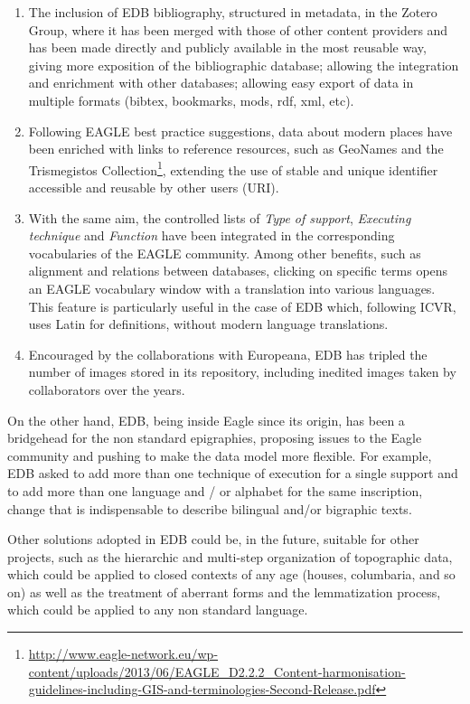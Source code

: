 \documentclass[amsthm,ebook]{saparticle}
\begin{document}
\begin{enumerate}
\item The inclusion of EDB bibliography, structured in metadata, in the Zotero Group, where it has been merged with those
of other content providers and has been made directly and publicly available in the most reusable way, giving more
exposition of the bibliographic database; allowing the integration and enrichment with other databases; allowing easy
export of data in multiple formats (bibtex, bookmarks, mods, rdf, xml, etc).

\item Following EAGLE best practice suggestions, data about modern places have been enriched with links to reference
resources, such as GeoNames and the Trismegistos Collection\footnote{
\url{http://www.eagle-network.eu/wp-content/uploads/2013/06/EAGLE\_D2.2.2\_Content-harmonisation-guidelines-including-GIS-and-terminologies-Second-Release.pdf}},
extending the use of stable and unique identifier accessible and reusable by other users (URI).

\item With the same aim, the controlled lists of \emph{Type of support}, \emph{Executing technique} and \emph{Function} have been integrated in
the corresponding vocabularies of the EAGLE community. Among other benefits, such as alignment and relations between
databases, clicking on specific terms opens an EAGLE vocabulary window with a translation into various languages. This
feature is particularly useful in the case of EDB which, following ICVR, uses Latin for definitions, without modern
language translations.

\item Encouraged by the collaborations with Europeana, EDB has tripled the number of images stored in its repository,
including inedited images taken by collaborators over the years. 
\end{enumerate}


On the other hand, EDB, being inside Eagle since its origin, has been a bridgehead for the non standard epigraphies,
proposing issues to the Eagle community and pushing to make the data model more flexible. For example, EDB asked to add
more than one technique of execution for a single support and to add more than one language and / or alphabet for the
same inscription, change that is indispensable to describe bilingual and/or bigraphic texts. 

Other solutions adopted in EDB could be, in the future, suitable for other projects, such as the hierarchic and
multi-step organization of topographic data, which could be applied to closed contexts of any age (houses, columbaria,
and so on) as well as the treatment of aberrant forms and the lemmatization process, which could be applied to any non
standard language. 
\end{document}
